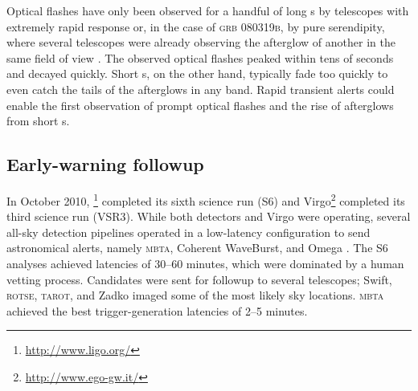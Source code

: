 Optical flashes have only been observed for a handful of long \GRB{}s
\citep{2011CRPhy..12..255A} by telescopes with extremely rapid response or, in
the case of \textsc{grb 080319b}, by pure serendipity, where several telescopes
were already observing the afterglow of another \GRB{} in the same field of
view \citep{2008Natur.455..183R}. The observed optical flashes peaked within
tens of seconds and decayed quickly.  Short \GRB{}s, on the other hand,
typically fade too quickly to even catch the tails of the afterglows in any
band. Rapid \GW{} transient alerts could enable the first observation of prompt
optical flashes and the rise of afterglows from short \GRB{}s.

\subsection{Early-warning \EM{} followup}

In October 2010, \LIGO{}\footnote{\url{http://www.ligo.org/}} completed its
sixth science run (S6) and Virgo\footnote{\url{http://www.ego-gw.it/}}
completed its third science run (VSR3).  While both \LIGO{} detectors and Virgo
were operating, several all-sky detection pipelines operated in a low-latency
configuration to send astronomical alerts, namely \textsc{mbta}, Coherent
WaveBurst, and Omega \citep{HugheyGWPAW2011, S6lowlatency}. The S6 analyses
achieved latencies of 30--60 minutes, which were dominated by a human vetting
process. Candidates were sent for \EM{} followup to several telescopes; Swift,
\textsc{rotse}, \textsc{tarot}, and Zadko \citep{kanner2008, HugheyGWPAW2011}
imaged some of the most likely sky locations.  \textsc{mbta} achieved the best
\GW{} trigger-generation latencies of 2--5 minutes.  

